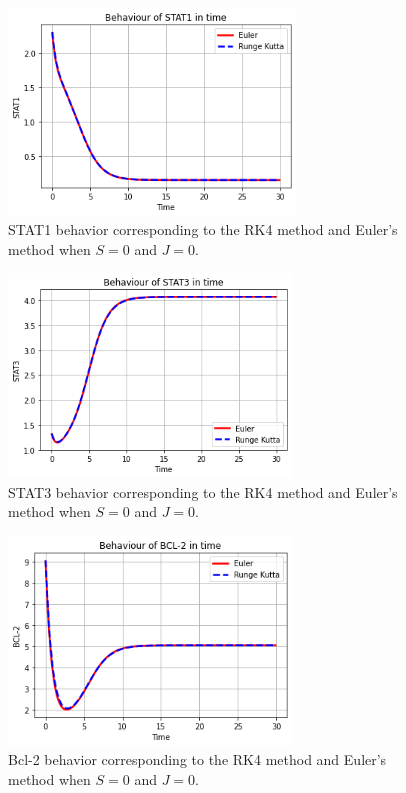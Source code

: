\begin{figure}[hbt!]
	\centering
	\begin{framed}
	\includegraphics[width=0.68\textwidth]{Figures/A/N3.png}
		\end{framed}
	\caption{STAT1 behavior corresponding to the RK4 method and Euler's method  when $S =0$ and $J=0$.}
	\label{r3}
\end{figure}
 
\begin{figure}[hbt!]
	\centering
	\begin{framed}
	\includegraphics[width=0.67\textwidth]{Figures/A/N4.png}
		\end{framed}
	\caption{STAT3 behavior corresponding to the RK4 method and Euler's method  when $S =0$ and $J=0$.}
	\label{r4}
\end{figure}

\begin{figure}[hbt!]
	\centering
	\begin{framed}
	\includegraphics[width=0.67\textwidth]{Figures/A/N5.png}
		\end{framed}
	\caption{Bcl-2 behavior corresponding to the RK4 method and Euler's method  when $S =0$ and $J=0$.}
	\label{r5}
\end{figure}

